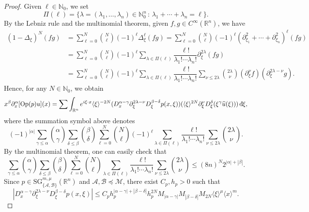 \documentclass[11pt,reqno]{amsart}
\numberwithin{equation}{section}
\newcommand{\dbar}{\mathrm{d}\hspace*{-0.15em}\bar{}\hspace*{0.1em}}
\newcommand{\R}{{\mathbb{R}}} %
\newcommand{\N}{{\mathbb{N}}} %
\newcommand{\SG}{{\mathrm{SG}}}
\newcommand{\M}{{\mathcal{M}}} %
\newcommand{\A}{{\mathcal{A}}} %
\newcommand{\B}{{\mathcal{B}}} %
\begin{document}
\begin{proof}
	Given $\ell\in\N_0$, we set
	\[\Pi(\ell)=\{\lambda=(\lambda_1,\dots,\lambda_n)\in\N_0^n\,:\, \lambda_1+\cdots+\lambda_n = \ell\}.\]
	By the Lebniz rule and the multinomial theorem, given $f,g\in C^\infty(\R^n)$, we have
	\begin{align*}
		(1-\Delta_\xi)^N(fg) & = \sum_{\ell=0}^N\binom{N}{\ell}(-1)^\ell\Delta_\xi^\ell(fg)
		 = \sum_{\ell=0}^N\binom{N}{\ell}(-1)^\ell (\partial_{\xi_1}^2+\cdots+\partial_{\xi_n}^2)^\ell(fg)\\
		&= \sum_{\ell=0}^N\binom{N}{\ell}(-1)^\ell \sum_{\lambda\in\Pi(\ell)}\dfrac{\ell!}{\lambda_1!\cdots\lambda_n!}\partial_\xi^{2\lambda}(fg)\\
		& = \sum_{\ell=0}^N\binom{N}{\ell}(-1)^\ell \sum_{\lambda\in\Pi(\ell)}\dfrac{\ell!}{\lambda_1!\cdots\lambda_n!} \sum_{\nu\leq 2\lambda}\binom{2\lambda}{\nu} (\partial_{\xi}^{\nu}f)(\partial_{\xi}^{2\lambda-\nu} g).
	\end{align*}
	Hence, for any $N\in\N_0$, we obtain
	\begin{equation*}
		x^\beta\partial_x^\alpha[\mathrm{Op}(p)u](x) = \sum \int_{\R^n} e^{i\xi\cdot x}\langle\xi\rangle^{-2N} (D_x^{\alpha-\gamma}\partial_\xi^{2\lambda-\nu}D_\xi^{\beta-\delta}p(x,\xi))(\langle\xi\rangle^{2N}\partial_\xi^\nu D_\xi^\delta (\xi^\gamma\widehat{u}(\xi)))\,\dbar\xi,
	\end{equation*}
	where the summation symbol above denotes
	\[(-1)^{|\alpha|}\sum_{\gamma\leq\alpha}\binom{\alpha}{\gamma} \sum_{\delta\leq\beta}\binom{\beta}{\delta}\sum_{\ell=0}^N\binom{N}{\ell}(-1)^\ell \sum_{\lambda\in\Pi(\ell)}\dfrac{\ell!}{\lambda_1!\cdots\lambda_n!} \sum_{\nu\leq 2\lambda}\binom{2\lambda}{\nu}.\]
	By the multinomial theorem, one can easily check that
	\begin{equation}\label{bound_sum_binom}
		\sum_{\gamma\leq\alpha}\binom{\alpha}{\gamma} \sum_{\delta\leq\beta}\binom{\beta}{\delta}\sum_{\ell=0}^N\binom{N}{\ell} \sum_{\lambda\in\Pi(\ell)}\dfrac{\ell!}{\lambda_1!\cdots\lambda_n!} \sum_{\nu\leq 2\lambda}\binom{2\lambda}{\nu} \leq (8n)^N 2^{|\alpha|+|\beta|}.
	\end{equation}
	Since $p\in {\SG}_{\{\A,\B\}}^{m,\mu}(\R^n)$ and $\A,\B\preceq\M$, there exist $C_p,h_p>0$ such that
	\begin{equation}\label{est_p}
		|D_x^{\alpha-\gamma}\partial_\xi^{2\lambda-\nu}D_\xi^{\beta-\delta}p(x,\xi)| \leq C_ph_p^{|\alpha-\gamma|+|\beta-\delta|}h_p^{2N}M_{|\alpha-\gamma|}M_{|\beta-\delta|}M_{2N}\langle\xi\rangle^{\mu}\langle x\rangle^{m}.
	\end{equation}

\end{proof}
\end{document}
